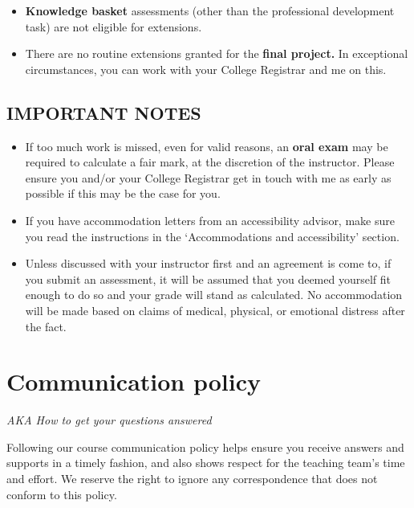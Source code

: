 \documentclass[
  openany]{book}
\begin{document}
\begin{itemize}
\item
  \textbf{Knowledge basket} assessments (other than the professional development task) are not eligible for extensions.
\item
  There are no routine extensions granted for the \textbf{final project.} In exceptional circumstances, you can work with your College Registrar and me on this.
\end{itemize}

\hypertarget{important-notes}{%
\subsection{IMPORTANT NOTES}\label{important-notes}}

\begin{itemize}
\item
  If too much work is missed, even for valid reasons, an \textbf{oral exam} may be required to calculate a fair mark, at the discretion of the instructor. Please ensure you and/or your College Registrar get in touch with me as early as possible if this may be the case for you.
\item
  If you have accommodation letters from an accessibility advisor, make sure you read the instructions in the `Accommodations and accessibility' section.
\item
  Unless discussed with your instructor first and an agreement is come to, if you submit an assessment, it will be assumed that you deemed yourself fit enough to do so and your grade will stand as calculated. No accommodation will be made based on claims of medical, physical, or emotional distress after the fact.
\end{itemize}

\hypertarget{communication-policy}{%
\section{Communication policy}\label{communication-policy}}

\emph{AKA How to get your questions answered}

Following our course communication policy helps ensure you receive answers and supports in a timely fashion, and also shows respect for the teaching team's time and effort. We reserve the right to ignore any correspondence that does not conform to this policy.
\end{document}
